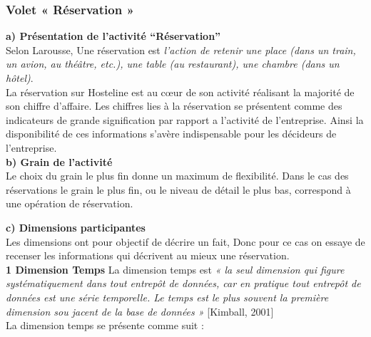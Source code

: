 \cleardoublepage
\subsubsection{Volet « Réservation »}

\textbf{a)	Présentation de l’activité “Réservation”}\\
Selon Larousse, Une réservation est  \textit{l’action de retenir une place (dans un train, un avion, au théâtre, etc.), une table (au restaurant), une chambre (dans un hôtel)}.\\
La réservation sur Hosteline est au cœur de son activité réalisant la majorité de son chiffre d’affaire. Les chiffres lies à la réservation se présentent comme des indicateurs de grande signification par rapport a l’activité de l’entreprise. Ainsi la disponibilité de ces informations s’avère indispensable pour les décideurs de l’entreprise.\\

\textbf{b)	Grain de l’activité}\\
Le choix du grain le plus fin donne un maximum de flexibilité. Dans le cas des réservations le grain le plus fin, ou le niveau de détail le plus bas, correspond à une opération de réservation.

\textbf{c)	Dimensions participantes}\\
Les dimensions ont pour objectif de décrire un fait, Donc pour ce cas on essaye de recenser les informations qui décrivent au mieux une réservation.\\

\textbf{1 Dimension Temps}
La dimension temps est \textit{« la seul dimension qui figure systématiquement dans tout entrepôt de données, car en pratique tout entrepôt de données est une série temporelle. Le temps est le plus souvent la première dimension sou jacent de la base de données »} [Kimball, 2001]\\

La dimension temps se présente comme suit :

